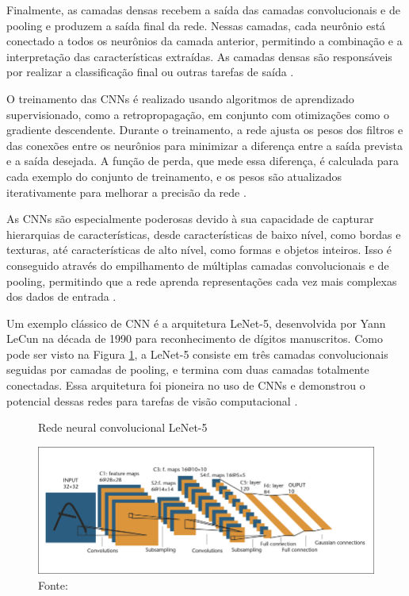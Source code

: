 Finalmente, as camadas densas recebem a saída das camadas convolucionais e de pooling e produzem a saída final da rede. Nessas camadas, cada neurônio está conectado a todos os neurônios da camada anterior, permitindo a combinação e a interpretação das características extraídas. As camadas densas são responsáveis por realizar a classificação final ou outras tarefas de saída \cite{nielsen2015neural}.


O treinamento das CNNs é realizado usando algoritmos de aprendizado supervisionado, como a retropropagação, em conjunto com otimizações como o gradiente descendente. Durante o treinamento, a rede ajusta os pesos dos filtros e das conexões entre os neurônios para minimizar a diferença entre a saída prevista e a saída desejada. A função de perda, que mede essa diferença, é calculada para cada exemplo do conjunto de treinamento, e os pesos são atualizados iterativamente para melhorar a precisão da rede \cite{aggarwal2018neural}.

As CNNs são especialmente poderosas devido à sua capacidade de capturar hierarquias de características, desde características de baixo nível, como bordas e texturas, até características de alto nível, como formas e objetos inteiros. Isso é conseguido através do empilhamento de múltiplas camadas convolucionais e de pooling, permitindo que a rede aprenda representações cada vez mais complexas dos dados de entrada \cite{goodfellow2016deep}.


Um exemplo clássico de CNN é a arquitetura LeNet-5, desenvolvida por Yann LeCun na década de 1990 para reconhecimento de dígitos manuscritos. Como pode ser visto na Figura \ref{fig:lenet5}, a LeNet-5 consiste em três camadas convolucionais seguidas por camadas de pooling, e termina com duas camadas totalmente conectadas. Essa arquitetura foi pioneira no uso de CNNs e demonstrou o potencial dessas redes para tarefas de visão computacional \cite{lecun1998gradient}.

\begin{figure}
    \centering   
    \caption{Rede neural convolucional LeNet-5}
    \includegraphics[width=\textwidth]{fig/A-Convolutional-Neural-Net-LeNet-5-From-Lecun-et-al-1998-C1998-IEEE-reprinted.png}
    \caption*{Fonte: \cite{lecun1998gradient}}
    \label{fig:lenet5}
\end{figure}


